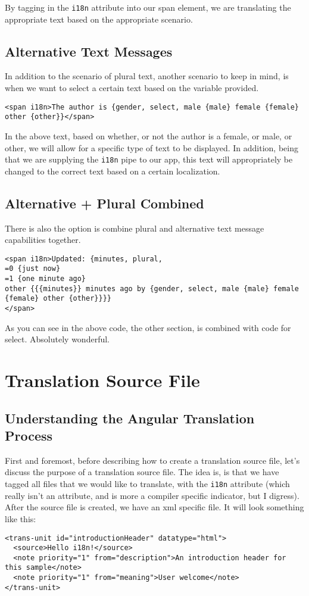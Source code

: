 By tagging in the \lstinline{i18n} attribute into our span element, we are 
translating the appropriate text based on the appropriate scenario. 

\subsection{Alternative Text Messages}
In addition to the scenario of plural text, another scenario to keep in mind, 
is when we want to select a certain text based on the variable provided. 

\begin{lstlisting}
<span i18n>The author is {gender, select, male {male} female {female} other {other}}</span>  
\end{lstlisting}

In the above text, based on whether, or not the author is a female, or male, or 
other, we will allow for a specific type of text to be displayed. In addition,
being that we are supplying the \lstinline{i18n} pipe to our app, this text 
will appropriately be changed to the correct text based on a certain localization.

\subsection{Alternative + Plural Combined}
There is also the option is combine plural and alternative text message capabilities 
together. 
\begin{lstlisting}
<span i18n>Updated: {minutes, plural,
=0 {just now}
=1 {one minute ago}
other {{{minutes}} minutes ago by {gender, select, male {male} female {female} other {other}}}}
</span>
\end{lstlisting}

As you can see in the above code, the other section, is combined with code for
select. Absolutely wonderful. 

\section{Translation Source File}
\subsection{Understanding the Angular Translation Process}
First and foremost, before describing how to create a translation source file,
let's discuss the purpose of a translation source file. The idea is, is that 
we have tagged all files that we would like to translate, with the \lstinline{i18n} 
attribute (which really isn't an attribute, and is more a compiler specific 
indicator, but I digress). After the source file is created, we have an xml 
specific file. It will look something like this: 
\begin{lstlisting}[caption=src/locale/messages.xlf]
<trans-unit id="introductionHeader" datatype="html">
  <source>Hello i18n!</source>
  <note priority="1" from="description">An introduction header for this sample</note>
  <note priority="1" from="meaning">User welcome</note>
</trans-unit>
\end{lstlisting}

